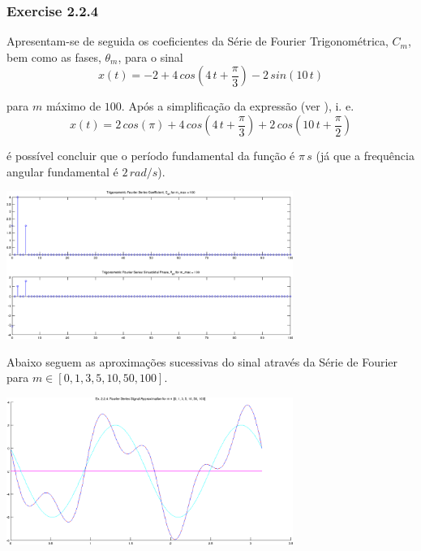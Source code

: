 \documentclass[a4paper]{article}
\begin{document}
\subsubsection{Exercise 2.2.4}
\label{subsubsec:ex_2_2_4}
\noindent Apresentam-se de seguida os coeficientes da Série de Fourier Trigonométrica, $C_m$, bem como as fases, $\theta_m$, para o sinal
\[
	x(t) = -2 + 4 \, cos\left(4 \, t + \frac{\pi}{3}\right) - 2 \, sin(10 \, t)
\]

\noindent para $m$ máximo de $100$. Após a simplificação da expressão (ver \emph{}), i. e.
\[
	x(t) = 2 \, cos(\pi) + 4 \, cos\left(4 \, t + \frac{\pi}{3}\right) + 2 \, cos\left(10 \, t + \frac{\pi}{2}\right)
\]

\noindent é possível concluir que o período fundamental da função é $\pi \, s$ (já que a frequência angular fundamental é $2 \, rad/s$).

\begin{center}
	\includegraphics[width=0.70\textwidth]{images/ex2_2_4_cm_tm.png}
	\label{fig:ex2_2_4_cm_tm}
\end{center}

\noindent Abaixo seguem as aproximações sucessivas do sinal através da Série de Fourier para $m \in [0, 1, 3, 5, 10, 50, 100]$.
\begin{center}
	\includegraphics[width=0.70\textwidth]{images/ex2_2_4_approx.png}
	\label{fig:ex2_2_4_approx}
\end{center}
\end{document}

